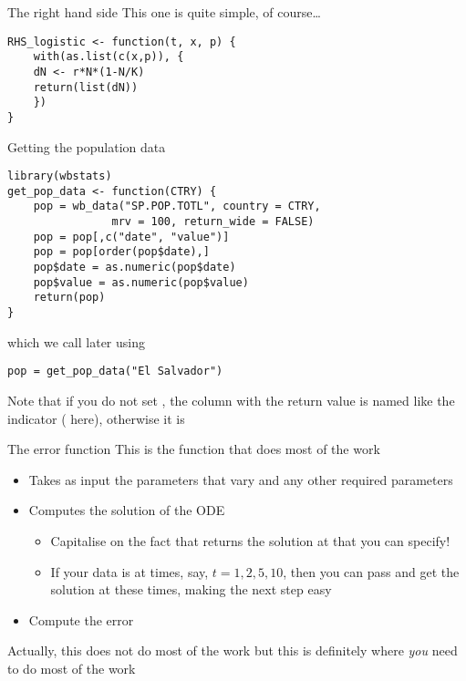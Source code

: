 \documentclass[aspectratio=43]{beamer}
\begin{document}
\begin{frame}[fragile]{The right hand side}
This one is quite simple, of course\ldots
\vfill
\begin{lstlisting}
RHS_logistic <- function(t, x, p) {
    with(as.list(c(x,p)), {
    dN <- r*N*(1-N/K)
    return(list(dN))
    })
}    
\end{lstlisting}
\end{frame}

\begin{frame}[fragile]{Getting the population data}
\begin{lstlisting}
library(wbstats)
get_pop_data <- function(CTRY) {
    pop = wb_data("SP.POP.TOTL", country = CTRY,
                mrv = 100, return_wide = FALSE)
    pop = pop[,c("date", "value")]
    pop = pop[order(pop$date),]
    pop$date = as.numeric(pop$date)
    pop$value = as.numeric(pop$value)
    return(pop)
}    
\end{lstlisting}
which we call later using
\begin{lstlisting}
pop = get_pop_data("El Salvador")
\end{lstlisting}
\vfill
Note that if you do not set , the column with the return value is named like the indicator ( here), otherwise it is 
\end{frame}


\begin{frame}{The error function}
    This is the function that does most of the work
    \vfill
    \begin{itemize}
        \item Takes as input the parameters that vary and any other required parameters
        \item Computes the solution of the ODE
        \begin{itemize}
            \item Capitalise on the fact that  returns the solution at  that you can specify!
            \item If your data is at times, say, $t=1,2,5,10$, then you can pass  and get the solution at these times, making the next step easy
        \end{itemize}
        \item Compute the error
    \end{itemize}
    \vfill
    Actually, this does not do most of the work but this is definitely where \emph{you} need to do most of the work
\end{frame}
\end{document}
